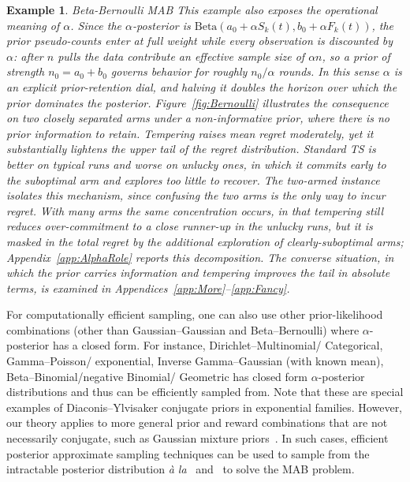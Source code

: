 \documentclass[11pt]{article}
\newtheorem{example}{Example}[section]
\begin{document}
\begin{example}{Beta-Bernoulli MAB}
This example also exposes the operational meaning of $\alpha$. Since the $\alpha$-posterior is $\mathrm{Beta}(a_0 + \alpha S_k(t), b_0 + \alpha F_k(t))$, the prior pseudo-counts enter at full weight while every observation is discounted by $\alpha$: after $n$ pulls the data contribute an \emph{effective sample size} of $\alpha n$, so a prior of strength $n_0 = a_0 + b_0$ governs behavior for roughly $n_0/\alpha$ rounds. In this sense $\alpha$ is an explicit \emph{prior-retention dial}, and halving it doubles the horizon over which the prior dominates the posterior. Figure~\ref{fig:Bernoulli} illustrates the consequence on two closely separated arms under a non-informative prior, where there is no prior information to retain. Tempering raises mean regret moderately, yet it substantially lightens the upper tail of the regret distribution. Standard TS is better on typical runs and worse on unlucky ones, in which it commits early to the suboptimal arm and explores too little to recover. The two-armed instance isolates this mechanism, since confusing the two arms is the only way to incur regret. With many arms the same concentration occurs, in that tempering still reduces over-commitment to a close runner-up in the unlucky runs, but it is masked in the total regret by the additional exploration of clearly-suboptimal arms; Appendix~\ref{app:AlphaRole} reports this decomposition. The converse situation, in which the prior carries information and tempering improves the tail in absolute terms, is examined in %
Appendices~\ref{app:More}--\ref{app:Fancy}.
\end{example}
For computationally efficient sampling, one can also use other prior-likelihood combinations (other than Gaussian--Gaussian and Beta--Bernoulli) where $\alpha$-posterior has a closed form. For instance, Dirichlet--Multinomial/ Categorical, Gamma--Poisson/ exponential, Inverse Gamma--Gaussian (with known mean), Beta--Binomial/negative Binomial/ Geometric has closed form $\alpha$-posterior distributions and thus can be efficiently sampled from. Note that these are special examples of Diaconis--Ylvisaker conjugate priors in exponential families.
However, our theory applies to more general prior and reward combinations that are not necessarily conjugate, such as Gaussian mixture priors~\cite{hong22b}. In such cases, efficient posterior approximate sampling techniques can be used to sample from the intractable posterior distribution \textit{\`a la}~\cite{mazumdar20a} and~\cite{hong22b} to solve the MAB problem.
\end{document}
